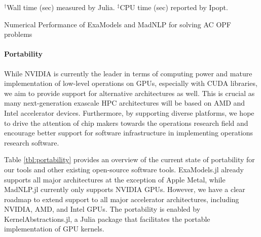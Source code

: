 \begin{table}[t]
  \begin{center}
    
    \vspace{-1em}
    \footnotesize
    $^\dag$Wall time (sec) measured by Julia. $^\ddag$CPU time (sec) reported by Ipopt.
  \end{center}
  \caption{Numerical Performance of ExaModels and MadNLP for solving AC OPF problems}
  \label{tab:num}
\end{table}

\paragraph{Portability}


While NVIDIA is currently the leader in terms of computing power and mature
implementation of low-level operations on GPUs, especially with CUDA
libraries, we aim to provide support for alternative architectures as
well. This is crucial as many next-generation exascale HPC
architectures will be based on AMD and Intel accelerator devices.
Furthermore, by supporting diverse platforms, we hope to drive the attention
of chip makers towards the operations research field and encourage better
support for software infrastructure in implementing operations research software.

Table \ref{tbl:portability} provides an overview of the current state
of portability for our tools and other existing open-source software
tools. ExaModels.jl already supports all major architectures at
the exception of Apple Metal, while
MadNLP.jl currently only supports NVIDIA GPUs. However, we have a
clear roadmap to extend support to all major accelerator
architectures, including NVIDIA, AMD, and Intel GPUs. The portability
is enabled by KernelAbstractions.jl, a Julia package that facilitates
the portable implementation of GPU kernels.

\begin{table}[t]
  \begin{center}
  \end{center}
  \caption{The current status on the portability of the NLP frameworks.}
  \label{tbl:portability}
\end{table}

